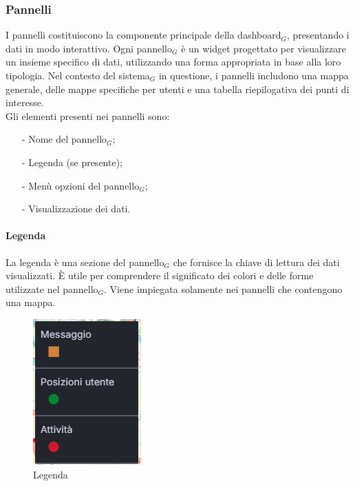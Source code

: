 \documentclass[10pt]{article}
\begin{document}
\begin{justify}
    \subsubsection{Pannelli}
    I pannelli costituiscono la componente principale della dashboard$_G$, presentando i dati in modo interattivo. Ogni pannello$_G$ è un widget progettato per visualizzare un insieme specifico di dati, utilizzando una forma appropriata in base alla loro tipologia. Nel contesto del sistema$_G$ in questione, i pannelli includono una mappa generale, delle mappe specifiche per utenti e una tabella riepilogativa dei punti di interesse.\\
    Gli elementi presenti nei pannelli sono:
    \begin{itemize}
        \item[-] Nome del pannello$_G$;
        \item[-] Legenda (se presente);
        \item[-] Menù opzioni del pannello$_G$;
        \item[-] Visualizzazione dei dati.
    \end{itemize}

    \paragraph{Legenda}
    La legenda è una sezione del pannello$_G$ che fornisce la chiave di lettura dei dati visualizzati. È utile per comprendere il significato dei colori e delle forme utilizzate nel pannello$_G$. Viene impiegata solamente nei pannelli che contengono una mappa.
    \begin{figure}[H]
    \centering
    \includegraphics[width=0.25\linewidth]{legenda.png}
    \caption{Legenda}
    \end{figure}


\end{justify}
\end{document}
